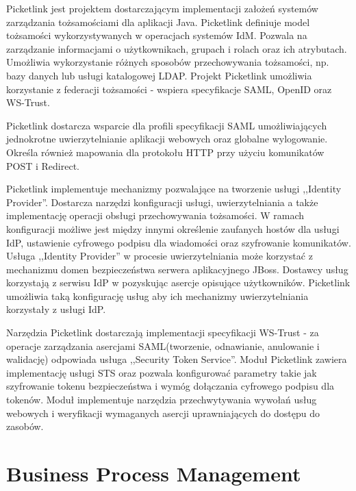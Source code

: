 \label{sec:picketlink}

Picketlink jest projektem dostarczającym implementacji założeń systemów zarządzania tożsamościami dla aplikacji Java. Picketlink definiuje model tożsamości wykorzystywanych w operacjach systemów IdM. Pozwala na zarządzanie informacjami o użytkownikach, grupach i rolach oraz ich atrybutach. Umożliwia wykorzystanie różnych sposobów przechowywania tożsamości, np. bazy danych lub usługi katalogowej LDAP. Projekt Picketlink umożliwia korzystanie z federacji tożsamości - wspiera specyfikacje SAML, OpenID oraz WS-Trust\cite{PicketLink13}.

Picketlink dostarcza wsparcie dla profili specyfikacji SAML umożliwiających jednokrotne uwierzytelnianie aplikacji webowych oraz globalne wylogowanie. Określa również mapowania dla protokołu HTTP przy użyciu komunikatów POST i Redirect. 

Picketlink implementuje mechanizmy pozwalające na tworzenie usługi ,,Identity Provider''. Dostarcza narzędzi konfiguracji usługi, uwierzytelniania a także implementację operacji obsługi przechowywania tożsamości. W ramach konfiguracji możliwe jest między innymi określenie zaufanych hostów dla usługi IdP, ustawienie cyfrowego podpisu dla wiadomości oraz szyfrowanie komunikatów. Usługa ,,Identity Provider'' w procesie uwierzytelniania może korzystać z mechanizmu domen bezpieczeństwa serwera aplikacyjnego JBoss. Dostawcy usług korzystają z serwisu IdP w pozyskując asercje opisujące użytkowników. Picketlink umożliwia taką konfigurację usług aby ich mechanizmy uwierzytelniania korzystały z usługi IdP.

Narzędzia Picketlink dostarczają implementacji specyfikacji WS-Trust - za operacje zarządzania asercjami SAML(tworzenie, odnawianie, anulowanie i walidację) odpowiada usługa ,,Security Token Service''. Moduł Picketlink zawiera implementację usługi STS oraz pozwala konfigurować parametry takie jak szyfrowanie tokenu bezpieczeństwa i wymóg dołączania cyfrowego podpisu dla tokenów. Moduł implementuje narzędzia przechwytywania wywołań usług webowych i weryfikacji wymaganych asercji uprawniających do dostępu do zasobów. 


\section{Business Process Management}
\label{sec:bpm}

